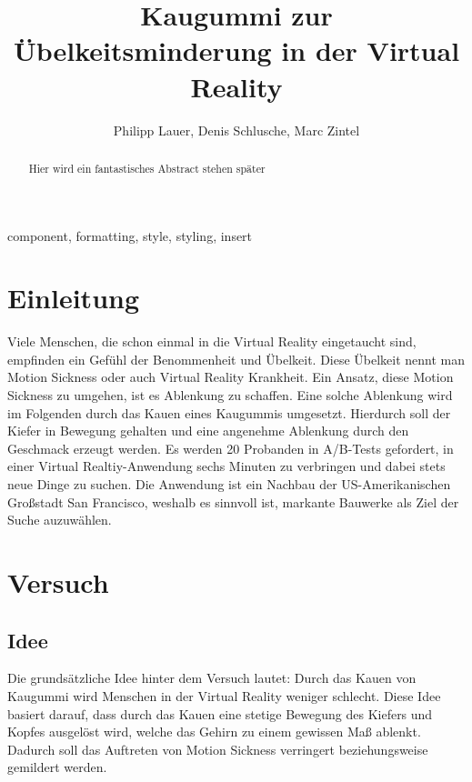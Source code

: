 \documentclass[conference]{IEEEtran}
\begin{document}
\title{Kaugummi zur Übelkeitsminderung in der Virtual Reality\\}

\author{Philipp Lauer, Denis Schlusche, Marc Zintel}

\maketitle

\begin{abstract}
Hier wird ein fantastisches Abstract stehen später
\end{abstract}

\begin{IEEEkeywords}
component, formatting, style, styling, insert
\end{IEEEkeywords}

\section{Einleitung}
Viele Menschen, die schon einmal in die Virtual Reality eingetaucht sind, empfinden ein Gefühl der Benommenheit und Übelkeit. Diese Übelkeit nennt man Motion Sickness oder auch Virtual Reality Krankheit. Ein Ansatz, diese Motion Sickness zu umgehen, ist es Ablenkung zu schaffen. Eine solche Ablenkung wird im Folgenden durch das Kauen eines Kaugummis umgesetzt. Hierdurch soll der Kiefer in Bewegung gehalten und eine angenehme Ablenkung durch den Geschmack erzeugt werden. Es werden 20 Probanden in A/B-Tests gefordert, in einer Virtual Realtiy-Anwendung sechs Minuten zu verbringen und dabei stets neue Dinge zu suchen. Die Anwendung ist ein Nachbau der US-Amerikanischen Großstadt San Francisco, weshalb es sinnvoll ist, markante Bauwerke als Ziel der Suche auzuwählen. 

\section{Versuch}
\subsection{Idee}
Die grundsätzliche Idee hinter dem Versuch lautet: Durch das Kauen von Kaugummi wird Menschen in der Virtual Reality weniger schlecht.
Diese Idee basiert darauf, dass durch das Kauen eine stetige Bewegung des Kiefers und Kopfes ausgelöst wird, welche das Gehirn zu einem gewissen Maß ablenkt. Dadurch soll das Auftreten von Motion Sickness verringert beziehungsweise gemildert werden. 
\end{document}

